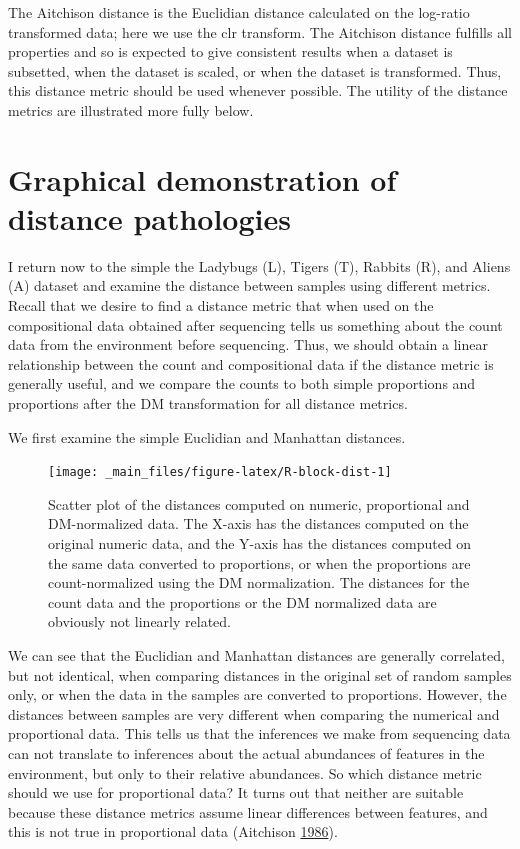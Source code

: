 \documentclass[onecolumn]{book}
\theoremstyle{definition}
\theoremstyle{definition}
\theoremstyle{definition}
\theoremstyle{remark}
\begin{document}
The Aitchison distance is the Euclidian distance calculated on the
log-ratio transformed data; here we use the clr transform. The Aitchison
distance fulfills all properties and so is expected to give consistent
results when a dataset is subsetted, when the dataset is scaled, or when
the dataset is transformed. Thus, this distance metric should be used
whenever possible. The utility of the distance metrics are illustrated
more fully below.

\hypertarget{graphical-demonstration-of-distance-pathologies}{%
\section{Graphical demonstration of distance
pathologies}\label{graphical-demonstration-of-distance-pathologies}}

I return now to the simple the Ladybugs (L), Tigers (T), Rabbits (R),
and Aliens (A) dataset and examine the distance between samples using
different metrics. Recall that we desire to find a distance metric that
when used on the compositional data obtained after sequencing tells us
something about the count data from the environment before sequencing.
Thus, we should obtain a linear relationship between the count and
compositional data if the distance metric is generally useful, and we
compare the counts to both simple proportions and proportions after the
DM transformation for all distance metrics.

We first examine the simple Euclidian and Manhattan distances.

\begin{figure}

{\centering \texttt{[image: \_main\_files/figure-latex/R-block-dist-1]} 

}

\caption{Scatter plot of the distances computed on numeric, proportional and DM-normalized data. The X-axis has the distances computed on the original numeric data, and the Y-axis has the distances computed on the same data converted to proportions, or when the proportions are count-normalized using the DM normalization. The distances for the count data and the proportions or the DM normalized data are obviously not linearly related.}\label{fig:R-block-dist}
\end{figure}

We can see that the Euclidian and Manhattan distances are generally
correlated, but not identical, when comparing distances in the original
set of random samples only, or when the data in the samples are
converted to proportions. However, the distances between samples are
very different when comparing the numerical and proportional data. This
tells us that the inferences we make from sequencing data can not
translate to inferences about the actual abundances of features in the
environment, but only to their relative abundances. So which distance
metric should we use for proportional data? It turns out that neither
are suitable because these distance metrics assume linear differences
between features, and this is not true in proportional data (Aitchison
\protect\hyperlink{ref-Aitchison:1986}{1986}).
\end{document}
